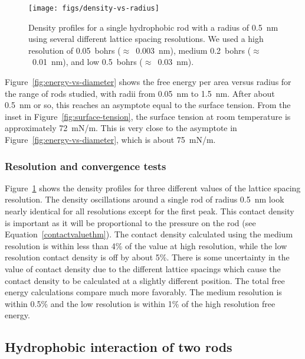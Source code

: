 \documentclass[letterpaper,twocolumn,amsmath,amssymb,prb]{revtex4-1}
\begin{document}
\begin{figure}
\begin{center}
\texttt{[image: figs/density-vs-radius]}
\end{center}
\caption{ Density profiles for 
a single hydrophobic rod with a radius of 0.5~nm using several different 
lattice spacing resolutions. We used a high resolution of 0.05~bohrs ($\approx$~0.003~nm), 
medium 0.2~bohrs ($\approx$~0.01~nm), and low 0.5~bohrs ($\approx$~0.03~nm).}
\label{fig:densityresolution}
\end{figure}

Figure~\ref{fig:energy-vs-diameter} shows the free energy per area versus
radius for the range of rods studied, with radii from 0.05~nm to 1.5~nm. After 
about 0.5~nm or so, this reaches
an asymptote equal to the surface tension. From the inset in 
Figure~\ref{fig:surface-tension}, the surface tension at room 
temperature is approximately 72~mN/m. This is very close to the 
asymptote in Figure~\ref{fig:energy-vs-diameter}, which is about 75~mN/m. 

\subsubsection{Resolution and convergence tests}
Figure~\ref{fig:densityresolution} shows the density profiles for three
different values of the lattice spacing resolution. The density oscillations
around a single rod of radius 0.5~nm look nearly identical for all resolutions
except for the first peak. This contact density is important as it will be
proportional to the pressure on the rod (see Equation~\ref{contactvaluethm}). The contact
density calculated using the medium resolution is within less than 4\% of the
value at high resolution, while the low resolution contact density is off by
about 5\%. There is some uncertainty in the value of contact density due to the
different lattice spacings which cause the contact density to be calculated
at a slightly different position. The total free energy calculations compare much more
favorably. The medium resolution is within 0.5\% and the low resolution is
within 1\% of the high resolution free energy.

\subsection{Hydrophobic interaction of two rods}
\end{document}
